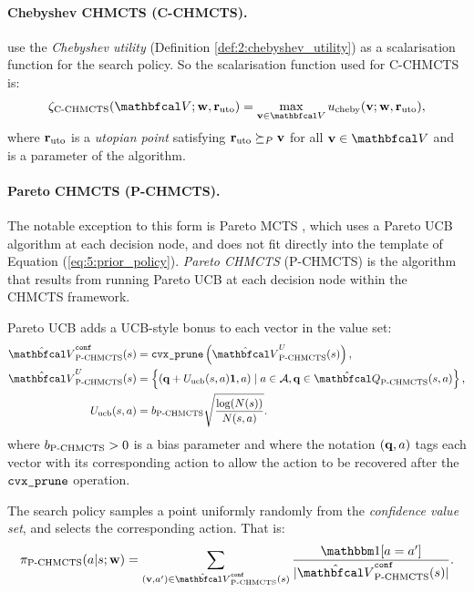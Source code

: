 \paragraph{Chebyshev CHMCTS (C-CHMCTS).}

    \citet{chebyshev_momcts} use the \textit{Chebyshev utility} (Definition \mbox{\ref{def:2:chebyshev_utility}}) as a scalarisation function for the search policy. So the scalarisation function used for C-CHMCTS is:
    \begin{align}
        \zetcchmcts(\bfcl{V};\bff{w},\ruto) = \max_{\bff{v}\in\bfcl{V}} \ucheby(\bff{v};\bff{w},\ruto),
    \end{align}
    where $\mathbf{r}_{\textnormal{uto}}$ is a \textit{utopian point} satisfying $\mathbf{r}_{\textnormal{uto}} \succeq_P \mathbf{v}$ for all $\bff{v}\in\bfcl{V}$ and is a parameter of the algorithm.

\paragraph{Pareto CHMCTS (P-CHMCTS).}

    The notable exception to this form is Pareto MCTS \cite{pareto_momcts}, which uses a Pareto UCB algorithm \cite{pareto_ucb,pareto_ucb_2} at each decision node, and does not fit directly into the template of Equation (\ref{eq:5:prior_policy}). \textit{Pareto CHMCTS} (P-CHMCTS) is the algorithm that results from running Pareto UCB at each decision node within the CHMCTS framework.

    Pareto UCB adds a UCB-style bonus to each vector in the value set:
    \begin{align}
        \Vparetoconf(s) &= \cprune\left( \Vparetou(s) \right), \\
        \Vparetou(s) &= \left\{ 
            \left(\bff{q} + U_{\textnormal{ucb}}(s,a)\bff{1}, a \right)
            \mid a \in \cl{A}, \bff{q} \in \Qpareto(s,a)
        \right\}, \\
        U_{\textnormal{ucb}}(s,a) &= \bpareto \sqrt{\frac{\log(N(s))}{N(s,a)}}.
    \end{align}
    where ${b_{{\textnormal{P-CHMCTS}}}} > 0$ is a bias parameter and where the notation $(\mathbf{q}, a)$ tags each vector with its corresponding action to allow the action to be recovered after the ${\textnormal{\texttt{cvx\_prune}}}$ operation.

    The search policy samples a point uniformly randomly from the \textit{confidence value set}, and selects the corresponding action. That is:
    \begin{align}
        \pipareto(a|s;\bff{w}) =  \sum_{(\bff{v},a')\in\Vparetoconf(s)} \frac{\one[a=a']}{|\Vparetoconf(s)|}.
    \end{align}


